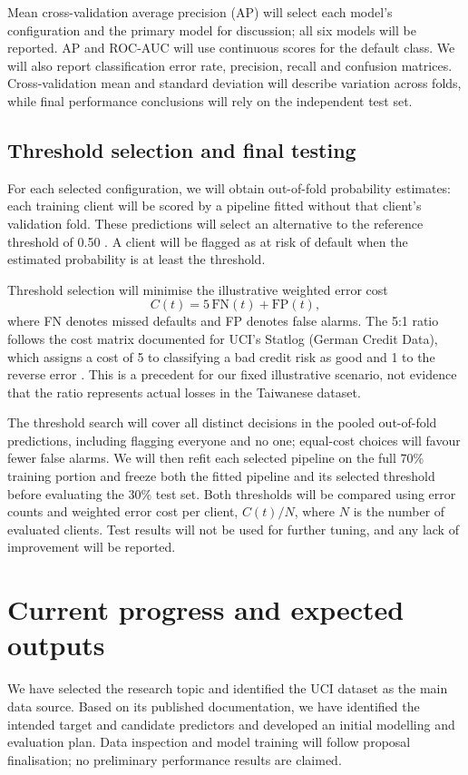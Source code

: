 \documentclass{article}
\begin{document}
Mean cross-validation average precision (AP) \citep{average_precision} will select each model's configuration and the primary model for discussion; all six models will be reported. AP and ROC-AUC will use continuous scores for the default class. We will also report classification error rate, precision, recall and confusion matrices. Cross-validation mean and standard deviation will describe variation across folds, while final performance conclusions will rely on the independent test set.

\subsection{Threshold selection and final testing}
For each selected configuration, we will obtain out-of-fold probability estimates: each training client will be scored by a pipeline fitted without that client's validation fold. These predictions will select an alternative to the reference threshold of 0.50 \citep{threshold}. A client will be flagged as at risk of default when the estimated probability is at least the threshold.

Threshold selection will minimise the illustrative weighted error cost
\begin{equation}
  C(t) = 5\,\mathrm{FN}(t) + \mathrm{FP}(t),
\end{equation}
where FN denotes missed defaults and FP denotes false alarms. The 5:1 ratio follows the cost matrix documented for UCI's Statlog (German Credit Data), which assigns a cost of 5 to classifying a bad credit risk as good and 1 to the reverse error \citep{german_credit}. This is a precedent for our fixed illustrative scenario, not evidence that the ratio represents actual losses in the Taiwanese dataset.

The threshold search will cover all distinct decisions in the pooled out-of-fold predictions, including flagging everyone and no one; equal-cost choices will favour fewer false alarms. We will then refit each selected pipeline on the full 70\% training portion and freeze both the fitted pipeline and its selected threshold before evaluating the 30\% test set. Both thresholds will be compared using error counts and weighted error cost per client, $C(t)/N$, where $N$ is the number of evaluated clients. Test results will not be used for further tuning, and any lack of improvement will be reported.

\section{Current progress and expected outputs}
We have selected the research topic and identified the UCI dataset as the main data source. Based on its published documentation, we have identified the intended target and candidate predictors and developed an initial modelling and evaluation plan. Data inspection and model training will follow proposal finalisation; no preliminary performance results are claimed.
\end{document}
